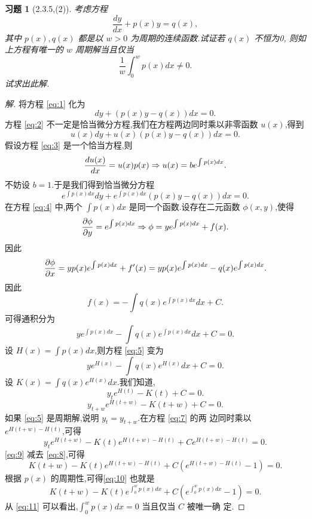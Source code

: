 \documentclass[a4paper, 12pt]{article} %
\newtheorem*{cdtheorem}{习题}
\newenvironment{exercise}
{\bigskip\begin{mdframed}[backgroundcolor=gray!40,rightline=false,leftline=false,topline=false,bottomline=false]\begin{cdtheorem}}
    {\end{cdtheorem}\end{mdframed}\bigskip}
\begin{document}
\begin{exercise}[2.3.5,(2)]
考虑方程
\begin{equation}
  \label{eq:1}
  \frac{dy}{dx}+p(x)y=q(x),
\end{equation}
其中 $p(x),q(x)$ 都是以 $w>0$ 为周期的连续函数.试证若 $q(x)$ 不恒为0,
则如上方程有唯一的 $w$ 周期解当且仅当
$$
\frac{1}{w}\int_0^wp(x)dx\neq 0.
$$
试求出此解.
\end{exercise}
\begin{proof}[解]
将方程 \eqref{eq:1} 化为
\begin{equation}
  \label{eq:2}
  dy+(p(x)y-q(x))dx=0.
\end{equation}
方程 \eqref{eq:2} 不一定是恰当微分方程,我们在方程两边同时乘以非零函数
$u(x)$,得到
\begin{equation}
  \label{eq:3}
  u(x)dy+u(x)(p(x)y-q(x))dx=0.
\end{equation}
假设方程 \eqref{eq:3} 是一个恰当方程,则
$$
\frac{du(x)}{dx}=u(x)p(x)\Rightarrow u(x)=be^{\int p(x)dx}.
$$
不妨设 $b=1$.于是我们得到恰当微分方程
\begin{equation}
  \label{eq:4}
  e^{\int p(x)dx}dy+e^{\int p(x)dx}(p(x)y-q(x))dx=0.
\end{equation}
在方程 \eqref{eq:4} 中,两个 $\int p(x)dx$ 是同一个函数.设存在二元函数
$\phi(x,y)$,使得
$$
\frac{\partial\phi}{\partial y}=e^{\int p(x)dx}\Rightarrow \phi=ye^{\int p(x)dx}+f(x).
$$
因此
$$
\frac{\partial \phi}{\partial x}=yp(x)e^{\int p(x)dx}+f'(x)=yp(x)e^{\int
  p(x)dx}-q(x)e^{\int p(x)dx}.
$$
因此
$$
f(x)=-\int q(x)e^{\int p(x)dx}dx+C.
$$
可得通积分为
\begin{equation}
  \label{eq:5}
  ye^{\int p(x)dx}-\int q(x)e^{\int p(x)dx}dx+C=0.
\end{equation}
设 $H(x)=\int p(x)dx$,则方程 \eqref{eq:5} 变为
\begin{equation}
  \label{eq:6}
  ye^{H(x)}-\int q(x)e^{H(x)}dx+C=0.
\end{equation}
设 $K(x)=\int q(x)e^{H(x)}dx$.我们知道,
\begin{equation}
  \label{eq:7}
  y_te^{H(t)}-K(t)+C=0.
\end{equation}
\begin{equation}
  \label{eq:8}
  y_{t+w}e^{H(t+w)}-K(t+w)+C=0.
\end{equation}
如果 \eqref{eq:5} 是周期解,说明 $y_t=y_{t+w}$.在方程 \eqref{eq:7} 的两
边同时乘以 $e^{H(t+w)-H(t)}$,可得
\begin{equation}
  \label{eq:9}
  y_te^{H(t+w)}-K(t)e^{H(t+w)-H(t)}+Ce^{H(t+w)-H(t)}=0.
\end{equation}
\eqref{eq:9} 减去 \eqref{eq:8},可得
\begin{equation}
  \label{eq:10}
  K(t+w)-K(t)e^{H(t+w)-H(t)}+C(e^{H(t+w)-H(t)}-1)=0.
\end{equation}
根据 $p(x)$ 的周期性,可得\eqref{eq:10} 也就是
\begin{equation}
  \label{eq:11}
  K(t+w)-K(t)e^{\int_{0}^{w}p(x)dx}+C(e^{\int_{0}^wp(x)dx}-1)=0.
\end{equation}
从 \eqref{eq:11} 可以看出,$\int_{0}^{w}p(x)dx=0$ 当且仅当 $C$ 被唯一确
定.
\end{proof}
\end{document}

